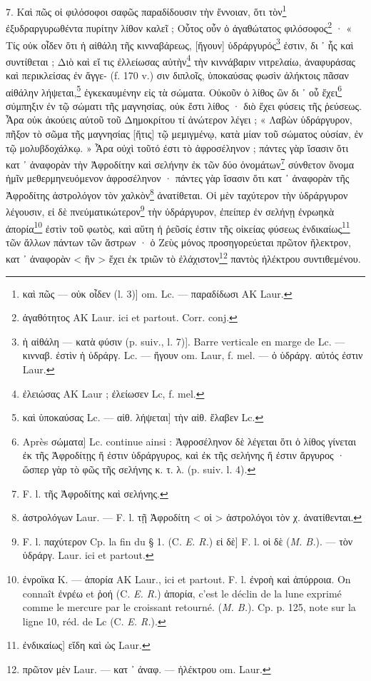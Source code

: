 \documentclass[a4paper, 11pt, oneside, polutonikogreek, french]{article}
\begin{document}
7. Καὶ πῶς οἱ φιλόσοφοι σαφῶς παραδίδουσιν τὴν ἔννοιαν, ὅτι τὸν\footnote{καὶ πῶς --- οὐκ οἶδεν (l. 3)] om. Lc. --- παραδίδωσι AK Laur.} ἐξυδραργυρωθέντα πυρίτην λίθον καλεῖ ; Οὗτος οὖν ὁ ἀγαθώτατος φιλόσοφος\footnote{ἀγαθότητος AK Laur. ici et partout. Corr. conj.} · « Τίς οὐκ οἶδεν ὅτι ἡ αἰθάλη τῆς κινναβάρεως, [ἤγουν] ὑδράργυρός\footnote{ἡ αἰθάλη --- κατὰ φύσιν (p. suiv., l. 7)]. Barre verticale en marge de Lc. --- κινναβ. ἐστὶν ἡ ὐδράργ. Lc. --- ἤγουν om. Laur, f. mel. --- ὁ ὑδράργ. αὐτός ἐστιν Laur.} ἐστιν, δι ᾽ ἧς καὶ συντίθεται ; Διὸ καὶ εἴ τις ἐλλείωσας αὐτὴν\footnote{ἐλειώσας AK Laur ; ἐλείωσεν Lc, f. mel.} τὴν κιννάβαριν νιτρελαίω, ἀναφυράσας καὶ περικλείσας ἐν ἄγγε- (f. 170 v.) σιν διπλοῖς, ὑποκαύσας φωσὶν ἀλήκτοις πᾶσαν αἰθάλην λήψεται,\footnote{καὶ ὑποκαύσας Lc. --- αἰθ. λήψεται] τὴν αἰθ. ἔλαβεν Lc.} ἐγκεκαυμένην εἰς τὰ σώματα. Οὐκοῦν ὁ λίθος ὢν δι ᾽ οὗ ἔχει\footnote{Après σώματα] Lc. continue ainsi : Ἀφροσέληνον δὲ λέγεται ὅτι ὁ λίθος γίνεται ἐκ τῆς Ἀφροδίτῃς ἥ ἐστιν ὑδράργυρος, καὶ ἐκ τῆς σελήνης ἥ ἐστιν ἄργυρος · ὥσπερ γὰρ τὸ φῶς τῆς σελήνης κ. τ. λ. (p. suiv. l. 4).} σύμπηξιν ἐν τῷ σώματι τῆς μαγνησίας, οὐκ ἔστι λίθος · διὸ ἔχει φύσεις τῆς ῥεύσεως. Ἆρα οὐκ ἀκούεις αὐτοῦ τοῦ Δημοκρίτου τί ἀνώτερον λέγει ; « Λαβὼν ὑδράργυρον, πῆξον τὸ σῶμα τῆς μαγνησίας [ἥτις] τῷ μεμιγμένῳ, κατὰ μίαν τοῦ σώματος οὐσίαν, ἐν τῷ μολυβδοχάλκῳ. » Ἆρα οὐχὶ τοῦτό ἐστι τὸ ἀφροσέληνον ; πάντες γὰρ ἴσασιν ὅτι κατ ᾽ ἀναφορὰν τὴν Ἀφροδίτην καὶ σελήνην ἐκ τῶν δύο ὀνομάτων\footnote{F. l. τῆς Ἀφροδίτης καὶ σελήνης.} σύνθετον ὄνομα ἡμῖν μεθερμηνευόμενον ἀφροσέληνον · πάντες γὰρ ἴσασιν ὅτι κατ ᾽ ἀναφορὰν τῆς Ἀφροδίτης ἀστρολόγον τὸν χαλκὸν\footnote{ἀστρολόγων Laur. --- F. l. τῇ Ἀφροδίτη < οἱ > ἀστρολόγοι τὸν χ. ἀνατίθενται.} ἀνατίθεται. Οἱ μὲν ταχύτερον τὴν ὑδράργυρον λέγουσιν, εἰ δὲ πνεύματικώτερον\footnote{F. l. παχύτερον Cp. la fin du § 1. (C. \emph{E. R.}) εἰ δὲ] F. l. οἱ δὲ (\emph{M. B.}). --- τὸν ὑδράργ. Laur. ici et partout.} τὴν ὑδράργυρον, ἐπείπερ ἐν σελήνῃ ἐνρωηκὰ ἀπορία\footnote{ἐνροϊκα K. --- ἀπορία AK Laur., ici et partout. F. l. ἐνροὴ καὶ ἀπύρροια. On connaît ἐνρέω et ῥοή (C. \emph{E. R.}) ἀπορία, c'est le déclin de la lune exprimé comme le mercure par le croissant retourné. (\emph{M. B.}). Cp. p. 125, note sur la ligne 10, réd. de Lc (C. \emph{E. R.}).} ἐστὶν τοῦ φωτὸς, καὶ αὕτη ἡ ῥεῦσίς ἐστιν τῆς οἰκείας φύσεως ἐνδικαίως\footnote{ἐνδικαίως] εἴδη καὶ ὡς Laur.} τῶν ἄλλων πάντων τῶν ἄστρων · ὁ Ζεὺς μόνος προσηγορεύεται πρῶτον ἤλεκτρον, κατ ᾽ ἀναφορὰν < ἣν > ἔχει ἐκ τριῶν τὸ ἐλάχιστον\footnote{πρῶτον μὲν Laur. --- κατ ᾽ ἀναφ. --- ἠλέκτρου om. Laur.} παντὸς ἠλέκτρου συντιθεμένου.
\end{document}
